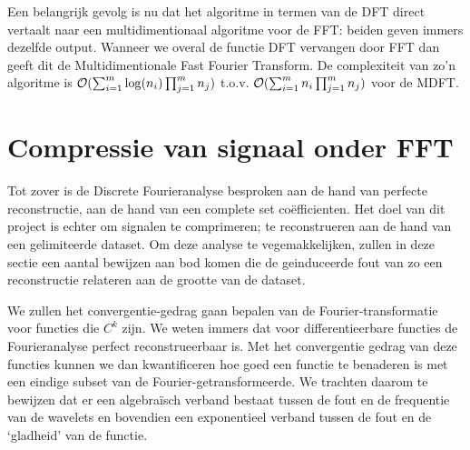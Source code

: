 Een belangrijk gevolg is nu dat het algoritme in termen van de DFT direct vertaalt naar een multidimentionaal algoritme voor de FFT: beiden geven immers dezelfde output. 
Wanneer we overal de functie DFT vervangen door FFT dan geeft dit de Multidimentionale Fast Fourier Transform.
De complexiteit van zo'n algoritme is $\mathcal{O}( \sum_{i=1}^m \log(n_i) \prod_{j=1}^m n_j)$ t.o.v.
$\mathcal{O}( \sum_{i=1}^m n_i \prod_{j=1}^m n_j)$ voor de MDFT.

\section{Compressie van signaal onder FFT}
Tot zover is de Discrete Fourieranalyse besproken aan de hand van perfecte reconstructie, 
aan de hand van een  complete set co\"efficienten. Het doel van dit project is echter om
signalen te comprimeren; te reconstrueren aan de hand van een gelimiteerde dataset.
Om deze analyse te vegemakkelijken, zullen in deze sectie een aantal bewijzen aan bod komen die
de geinduceerde fout van zo een reconstructie relateren aan de grootte van de dataset.

We zullen het convergentie-gedrag gaan bepalen van de Fourier-transformatie voor functies die $C^k$ zijn.
We weten immers dat voor differentieerbare functies de Fourieranalyse perfect reconstrueerbaar is.
Met het convergentie gedrag van deze functies kunnen we dan kwantificeren hoe goed een functie te 
benaderen is met een eindige subset van de Fourier-getransformeerde.
We trachten daarom te bewijzen dat er een algebra\"isch verband bestaat tussen de fout en de frequentie
van de wavelets en bovendien een exponentieel verband tussen de fout en de `gladheid' van de functie.


